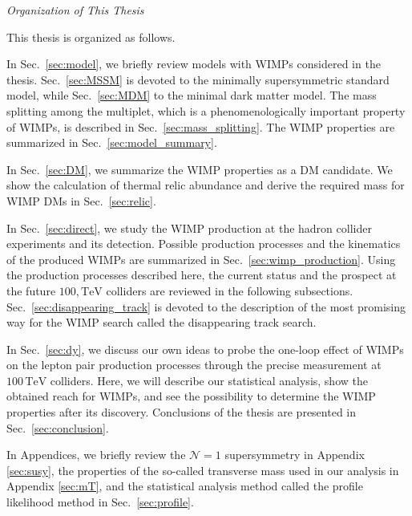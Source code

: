 \documentclass[12pt,twoside,book]{article}
\begin{document}




\clearpage

\begin{center}
  \Large \textit{Organization of This Thesis}
\end{center}

This thesis is organized as follows.

In Sec.~\ref{sec:model}, we briefly review models with WIMPs considered in the thesis.
Sec.~\ref{sec:MSSM} is devoted to the minimally supersymmetric standard model, while Sec.~\ref{sec:MDM} to the minimal dark matter model.
The mass splitting among the multiplet, which is a phenomenologically important property of WIMPs, is described in Sec.~\ref{sec:mass_splitting}.
The WIMP properties are summarized in Sec.~\ref{sec:model_summary}.

In Sec.~\ref{sec:DM}, we summarize the WIMP properties as a DM candidate.
We show the calculation of thermal relic abundance and derive the required mass for WIMP DMs in Sec.~\ref{sec:relic}.

In Sec.~\ref{sec:direct}, we study the WIMP production at the hadron collider experiments and its detection.
Possible production processes and the kinematics of the produced WIMPs are summarized in Sec.~\ref{sec:wimp_production}.
Using the production processes described here, the current status and the prospect at the future $100,\mathrm{TeV}$ colliders are reviewed in the following subsections.
Sec.~\ref{sec:disappearing_track} is devoted to the description of the most promising way for the WIMP search called the disappearing track search.

In Sec.~\ref{sec:dy}, we discuss our own ideas \cite{Chigusa:2018vxz,Abe:2019egv} to probe the one-loop effect of WIMPs on the lepton pair production processes through the precise measurement at $100\,\mathrm{TeV}$ colliders.
Here, we will describe our statistical analysis, show the obtained reach for WIMPs, and see the possibility to determine the WIMP properties after its discovery.
Conclusions of the thesis are presented in Sec.~\ref{sec:conclusion}.

In Appendices, we briefly review the $\mathcal{N}=1$ supersymmetry in Appendix \ref{sec:susy}, the properties of the so-called transverse mass used in our analysis in Appendix \ref{sec:mT}, and the statistical analysis method called the profile likelihood method in Sec.~\ref{sec:profile}.
\end{document}
